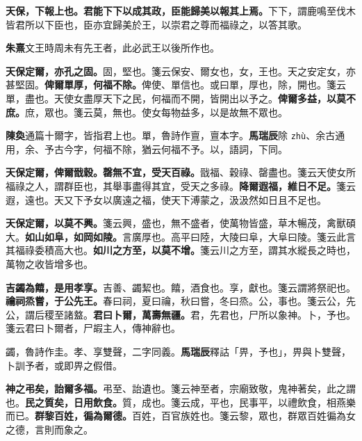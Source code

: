 
\textbf{天保，下報上也。君能下下以成其政，臣能歸美以報其上焉。}{\footnotesize 下下，謂鹿鳴至伐木皆君所以下臣也，臣亦宜歸美於王，以崇君之尊而福祿之，以答其歌。}

\begin{quoting}\textbf{朱熹}文王時周未有先王者，此必武王以後所作也。\end{quoting}

\textbf{天保定爾，亦孔之固。}{\footnotesize 固，堅也。箋云保安、爾女也，女，王也。天之安定女，亦甚堅固。}\textbf{俾爾單厚，何福不除。}{\footnotesize 俾使、單信也。或曰單，厚也，除，開也。箋云單，盡也。天使女盡厚天下之民，何福而不開，皆開出以予之。}\textbf{俾爾多益，以莫不庶。}{\footnotesize 庶，眾也。箋云莫，無也。使女每物益多，以是故無不眾也。}

\begin{quoting}\textbf{陳奐}通篇十爾字，皆指君上也。單，魯詩作亶，亶本字。\textbf{馬瑞辰}除 \texttt{zhù}、余古通用，余、予古今字，何福不除，猶云何福不予。以，語詞，下同。\end{quoting}

\textbf{天保定爾，俾爾戩穀。罄無不宜，受天百祿。}{\footnotesize 戩福、穀祿、罄盡也。箋云天使女所福祿之人，謂群臣也，其舉事盡得其宜，受天之多祿。}\textbf{降爾遐福，維日不足。}{\footnotesize 箋云遐，遠也。天又下予女以廣遠之福，使天下溥蒙之，汲汲然如日且不足也。}

\textbf{天保定爾，以莫不興。}{\footnotesize 箋云興，盛也，無不盛者，使萬物皆盛，草木暢茂，禽獸碩大。}\textbf{如山如阜，如岡如陵。}{\footnotesize 言廣厚也。高平曰陸，大陵曰阜，大阜曰陵。箋云此言其福祿委積高大也。}\textbf{如川之方至，以莫不增。}{\footnotesize 箋云川之方至，謂其水縱長之時也，萬物之收皆增多也。}

\textbf{吉蠲為饎，是用孝享。}{\footnotesize 吉善、蠲絜也。饎，酒食也。享，獻也。箋云謂將祭祀也。}\textbf{禴祠烝嘗，于公先王。}{\footnotesize 春曰祠，夏曰禴，秋曰嘗，冬曰烝。公，事也。箋云公，先公，謂后稷至諸盩。}\textbf{君曰卜爾，萬壽無疆。}{\footnotesize 君，先君也，尸所以象神。卜，予也。箋云君曰卜爾者，尸嘏主人，傳神辭也。}

\begin{quoting}蠲，魯詩作圭。孝、享雙聲，二字同義。\textbf{馬瑞辰}釋詁「畀，予也」，畀與卜雙聲，卜訓予者，或即畀之假借。\end{quoting}

\textbf{神之弔矣，詒爾多福。}{\footnotesize 弔至、詒遺也。箋云神至者，宗廟致敬，鬼神著矣，此之謂也。}\textbf{民之質矣，日用飲食。}{\footnotesize 質，成也。箋云成，平也，民事平，以禮飲食，相燕樂而已。}\textbf{群黎百姓，徧為爾德。}{\footnotesize 百姓，百官族姓也。箋云黎，眾也，群眾百姓徧為女之德，言則而象之。}

